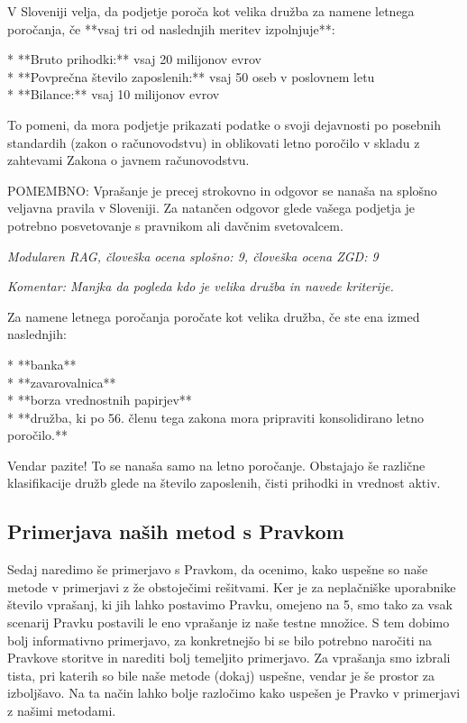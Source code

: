 \documentclass[a4paper,12pt,openright]{book}
\begin{document}
\begin{mdframed}[linewidth=1pt]
    \raggedright
    \ttfamily
V Sloveniji velja, da podjetje poroča kot velika družba za namene letnega poročanja, če **vsaj tri od naslednjih meritev izpolnjuje**:

* **Bruto prihodki:** vsaj 20 milijonov evrov \\
* **Povprečna število zaposlenih:** vsaj 50 oseb v poslovnem letu \\
* **Bilance:** vsaj 10 milijonov evrov

To pomeni, da mora podjetje prikazati podatke o svoji dejavnosti po posebnih standardih (zakon o računovodstvu) in oblikovati letno poročilo v skladu z zahtevami Zakona o javnem računovodstvu.


POMEMBNO:  Vprašanje je precej strokovno in odgovor se nanaša na splošno veljavna pravila v Sloveniji. Za natančen odgovor glede vašega podjetja je potrebno posvetovanje s pravnikom ali davčnim svetovalcem.
\end{mdframed}

\textit{Modularen RAG, človeška ocena splošno: 9, človeška ocena ZGD: 9}

\textit{Komentar: Manjka da pogleda kdo je velika družba in navede kriterije.}

\begin{mdframed}[linewidth=1pt]
    \raggedright
    \ttfamily
Za namene letnega poročanja poročate kot velika družba, če ste ena izmed naslednjih:

* **banka** \\
* **zavarovalnica** \\
* **borza vrednostnih papirjev** \\
* **družba, ki po 56. členu tega zakona mora pripraviti konsolidirano letno poročilo.**

Vendar pazite! To se nanaša samo na letno poročanje.  Obstajajo še različne klasifikacije družb glede na število zaposlenih, čisti prihodki in vrednost aktiv.
\end{mdframed}

\subsection{Primerjava naših metod s Pravkom}

Sedaj naredimo še primerjavo s Pravkom, da ocenimo, kako uspešne so naše metode v primerjavi z že obstoječimi rešitvami. Ker je za neplačniške uporabnike število vprašanj, ki jih lahko postavimo Pravku, omejeno na 5, smo tako za vsak scenarij Pravku postavili le eno vprašanje iz naše testne množice. S tem dobimo bolj informativno primerjavo, za konkretnejšo bi se bilo potrebno naročiti na Pravkove storitve in narediti bolj temeljito primerjavo. Za vprašanja smo izbrali tista, pri katerih so bile naše metode (dokaj) uspešne, vendar je še prostor za izboljšavo. Na ta način lahko bolje razločimo kako uspešen je Pravko v primerjavi z našimi metodami.
\end{document}
